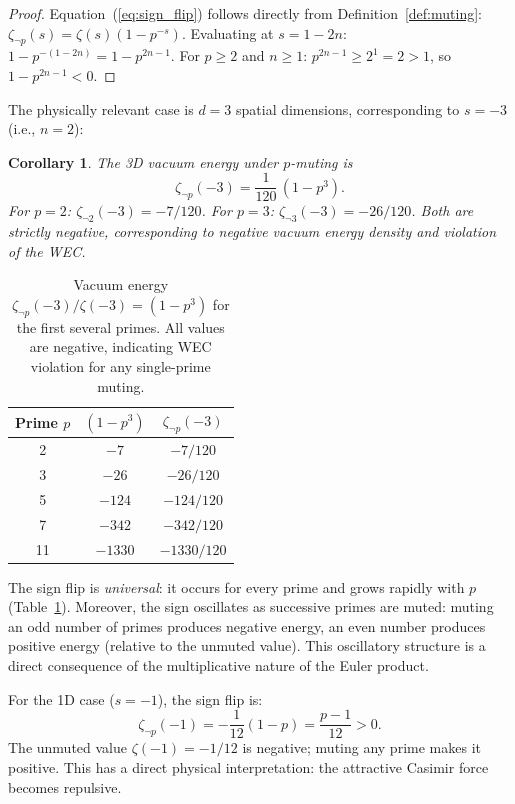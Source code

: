 \documentclass[aps,prd,twocolumn,superscriptaddress,nofootinbib]{revtex4-2}
\newtheorem{corollary}[theorem]{Corollary}
\begin{document}
\begin{proof}
Equation~(\ref{eq:sign_flip}) follows directly from
Definition~\ref{def:muting}: $\zeta_{\neg p}(s) = \zeta(s)(1-p^{-s})$.
Evaluating at $s = 1 - 2n$:
$1 - p^{-(1-2n)} = 1 - p^{2n-1}$.
For $p \geq 2$ and $n \geq 1$: $p^{2n-1} \geq 2^1 = 2 > 1$,
so $1 - p^{2n-1} < 0$.
\end{proof}

The physically relevant case is $d = 3$ spatial dimensions,
corresponding to $s = -3$ (i.e., $n = 2$):

\begin{corollary}
\label{cor:3d}
The 3D vacuum energy under $p$-muting is
\begin{equation}
  \zeta_{\neg p}(-3) = \frac{1}{120}\,(1 - p^3).
  \label{eq:3d_muted}
\end{equation}
For $p = 2$: $\zeta_{\neg 2}(-3) = -7/120$.
For $p = 3$: $\zeta_{\neg 3}(-3) = -26/120$.
Both are strictly negative, corresponding to negative vacuum
energy density and violation of the WEC.
\end{corollary}

\begin{table}[t]
\centering
\caption{Vacuum energy $\zeta_{\neg p}(-3)/\zeta(-3) = (1 - p^3)$
for the first several primes. All values are negative, indicating
WEC violation for any single-prime muting.}
\label{tab:sign_flip}
\begin{tabular}{@{}ccc@{}}
\toprule
Prime $p$ & $(1 - p^3)$ & $\zeta_{\neg p}(-3)$ \\
\midrule
2 & $-7$ & $-7/120$ \\
3 & $-26$ & $-26/120$ \\
5 & $-124$ & $-124/120$ \\
7 & $-342$ & $-342/120$ \\
11 & $-1330$ & $-1330/120$ \\
\bottomrule
\end{tabular}
\end{table}

The sign flip is \emph{universal}: it occurs for every prime
and grows rapidly with $p$ (Table~\ref{tab:sign_flip}).
Moreover, the sign oscillates as successive primes are muted:
muting an odd number of primes produces negative energy,
an even number produces positive energy (relative to the
unmuted value). This oscillatory structure is a direct
consequence of the multiplicative nature of the Euler product.

For the 1D case ($s=-1$), the sign flip is:
\begin{equation}
  \zeta_{\neg p}(-1) = -\frac{1}{12}(1-p) = \frac{p-1}{12} > 0.
\end{equation}
The unmuted value $\zeta(-1) = -1/12$ is negative; muting any
prime makes it positive. This has a direct physical interpretation:
the attractive Casimir force becomes repulsive.
\end{document}
